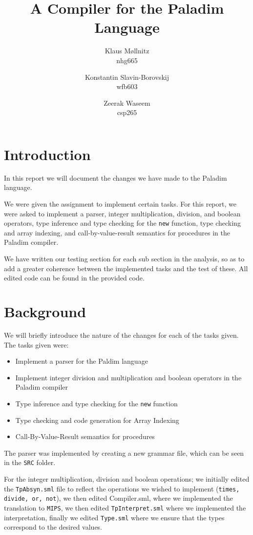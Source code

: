 \documentclass[10pt]{article}
\title{A Compiler for the \textbf{Paladim} Language}
\author{
    Klaus Møllnitz\\
    nhg665
  \and
    Konstantin Slavin-Borovskij\\
    wfb603
  \and
    Zeerak Waseem\\
    csp265
}
\begin{document}
\maketitle

\tableofcontents
\section{Introduction}
In this report we will document the changes we have made to the Paladim language. 

We were given the assignment to implement certain tasks. For this report, we were asked to implement a parser, integer multiplication, division, and boolean operators, type inference and type checking for the \texttt{new} function, type checking and array indexing, and call-by-value-result semantics for procedures in the Paladim compiler.

We have written our testing section for each sub section in the analysis, so as to add a greater coherence between the implemented tasks and the test of these. All edited code can be found in the provided code.

\section{Background}

We will briefly introduce the nature of the changes for each of the tasks given. The tasks given were:
\begin{itemize}
\item Implement a parser for the Paldim language
\item Implement integer division and multiplication and boolean operators in the Paladim compiler
\item Type inference and type checking for the \texttt{new} function
\item Type checking and code generation for Array Indexing
\item Call-By-Value-Result semantics for procedures
\end{itemize}

The parser was implemented by creating a new grammar file, which can be seen in the \texttt{SRC} folder.

For the integer multiplication, division and boolean operations; we initially edited the \texttt{TpAbsyn.sml} file to reflect the operations we wished to implement (\texttt{times, divide, or, not}), we then edited Compiler.sml, where we implemented the translation to \texttt{MIPS}, we then edited \texttt{TpInterpret.sml} where we implemented the interpretation, finally we edited \texttt{Type.sml} where we ensure that the types correspond to the desired values.
\end{document}
